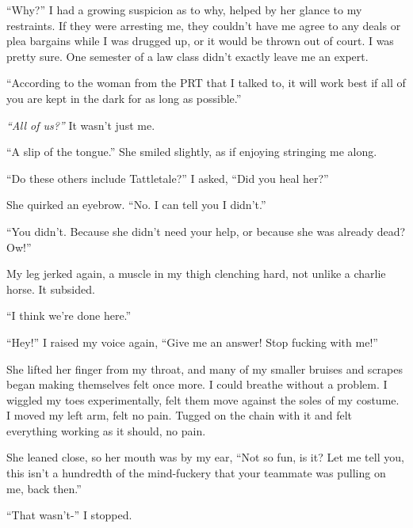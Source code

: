 ``Why?''  I had a growing suspicion as to why, helped by her glance to my restraints.  If they were arresting me, they couldn't have me agree to any deals or plea bargains while I was drugged up, or it would be thrown out of court.  I was pretty sure.  One semester of a law class didn't exactly leave me an expert.



``According to the woman from the PRT that I talked to, it will work best if all of you are kept in the dark for as long as possible.''



\emph{``All of us?''}  It wasn't just me.



``A slip of the tongue.'' She smiled slightly, as if enjoying stringing me along.



``Do these others include Tattletale?'' I asked, ``Did you heal her?''



She quirked an eyebrow.  ``No.  I can tell you I didn't.''



``You didn't.  Because she didn't need your help, or because she was already dead?  Ow!''



My leg jerked again, a muscle in my thigh clenching hard, not unlike a charlie horse.  It subsided.



``I think we're done here.''



``Hey!'' I raised my voice again, ``Give me an answer!  Stop fucking with me!''



She lifted her finger from my throat, and many of my smaller bruises and scrapes began making themselves felt once more.  I could breathe without a problem.  I wiggled my toes experimentally, felt them move against the soles of my costume.  I moved my left arm, felt no pain.  Tugged on the chain with it and felt everything working as it should, no pain.



She leaned close, so her mouth was by my ear, ``Not so fun, is it?  Let me tell you, this isn't a hundredth of the mind-fuckery that your teammate was pulling on me, back then.''



``That wasn't-'' I stopped.



